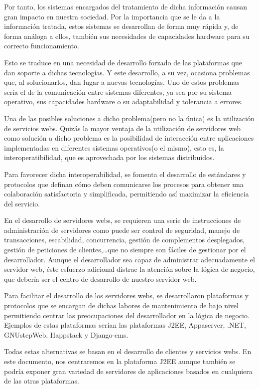 \documentclass[a4paper, 10pt]{article}
\begin{document}
	Por tanto, los sistemas encargados del tratamiento de dicha información causan
	gran impacto en nuestra sociedad. Por la importancia que se le da a la información
	tratada, estos sistemas se desarrollan de forma muy rápida y, de forma análoga a
	ellos, también sus necesidades de capacidades hardware para su correcto funcionamiento.
	
	Esto se traduce en una necesidad de desarrollo forzado de las plataformas que dan
	soporte a dichas tecnologías. Y este desarrollo, a su vez, ocasiona problemas que,
	al solucionarlos, dan lugar a nuevas tecnologías. Uno de estos problemas sería el de
	la comunicación entre sistemas diferentes, ya sea por su sistema operativo, sus
	capacidades hardware o su adaptabilidad y tolerancia a errores.
	
	Una de las posibles soluciones a dicho problema(pero no la única) es la utilización
	de servicios webs. Quizás la mayor ventaja de la utilización de servidores web como
	solución a dicho problema es la posibilidad de interacción entre aplicaciones
	implementadas en diferentes sistemas operativos(o el mismo), esto es, la
	interoperatibilidad, que es aprovechada por los sistemas distribuidos.
	
	Para favorecer dicha interoperabilidad, se fomenta el desarrollo de estándares y
	protocolos que definan cómo deben comunicarse los procesos para obtener una
	colaboración satisfactoria y simplificada, permitiendo así maximizar la eficiencia
	del servicio.
	
	En el desarrollo de servidores webs, se requieren una serie de instrucciones de
	administración de servidores como puede ser control de seguridad, manejo de
	transacciones, escabilidad, concurrencia, gestión de complementos desplegados,
	gestión de peticiones de clientes,\dots que no siempre son fáciles de gestionar por
	el desarrollador. Aunque el desarrollador sea capaz de administrar adecuadamente el
	servidor web, éste esfuerzo adicional distrae la atención sobre la lógica de negocio,
	que debería ser el centro de desarrollo de nuestro servidor web.
	
	Para facilitar el desarrollo de los servidores webs, se desarrollaron plataformas y
	protocolos que se encargan de dichas labores de mantenimiento de bajo nivel permitiendo
	centrar las preocupaciones del desarrollador en la lógica de negocio. Ejemplos de estas
	plataformas serían las plataformas J2EE, Appaserver, .NET, GNUstepWeb, Happstack y
	Django-cms.
	
	Todas estas alternativas se basan en el desarrollo de clientes y servicios webs. En
	este documento, nos centraremos en la plataforma J2EE aunque también se podría exponer
	gran variedad de servidores de aplicaciones basados en cualquiera de las otras plataformas.
	
\end{document}
